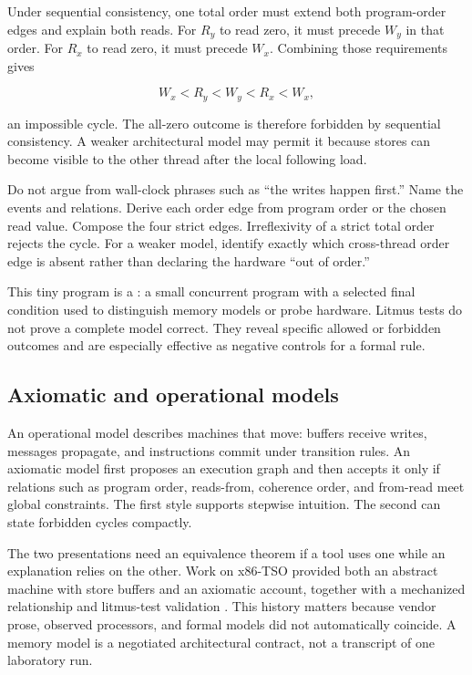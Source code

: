 Under sequential consistency, one total order must extend both program-order
edges and explain both reads. For \(R_y\) to read zero, it must precede
\(W_y\) in that order. For \(R_x\) to read zero, it must precede \(W_x\).
Combining those requirements gives

\[
 W_x < R_y < W_y < R_x < W_x,
\]

an impossible cycle. The all-zero outcome is therefore forbidden by
sequential consistency. A weaker architectural model may permit it because
stores can become visible to the other thread after the local following load.

\begin{proofkit}[title={Cycle proof for the store-buffering outcome}]
Do not argue from wall-clock phrases such as ``the writes happen first.'' Name
the events and relations. Derive each order edge from program order or the
chosen read value. Compose the four strict edges. Irreflexivity of a strict
total order rejects the cycle. For a weaker model, identify exactly which
cross-thread order edge is absent rather than declaring the hardware
``out of order.''
\end{proofkit}

This tiny program is a : a small concurrent program with
a selected final condition used to distinguish memory models or probe
hardware. Litmus tests do not prove a complete model correct. They reveal
specific allowed or forbidden outcomes and are especially effective as
negative controls for a formal rule.

\subsection{Axiomatic and operational models}

An operational model describes machines that move: buffers receive writes,
messages propagate, and instructions commit under transition rules. An
axiomatic model first proposes an execution graph and then accepts it only if
relations such as program order, reads-from, coherence order, and from-read
meet global constraints. The first style supports stepwise intuition. The
second can state forbidden cycles compactly.

The two presentations need an equivalence theorem if a tool uses one while an
explanation relies on the other. Work on x86-TSO provided both an abstract
machine with store buffers and an axiomatic account, together with a
mechanized relationship and litmus-test validation
\autocite{owens2009x86tso}. This history matters because vendor prose, observed
processors, and formal models did not automatically coincide. A memory model
is a negotiated architectural contract, not a transcript of one laboratory
run.

